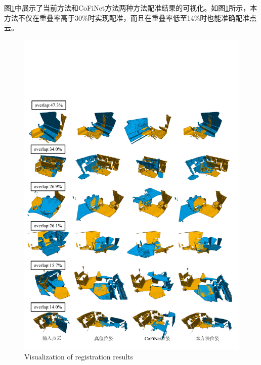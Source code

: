     图\ref{fig:4-4}中展示了当前方法和CoFiNet方法两种方法配准结果的可视化。如图\ref{fig:4-4}所示，本方法不仅在重叠率高于30\%时实现配准，而且在重叠率低至14\%时也能准确配准点云。
    \vspace{-0.1cm}
    \begin{figure}[H]
        \centering
        \includegraphics[width = \textwidth]{my/figure/4-4.pdf}
        {\wuhao Visualization of registration results
        }
        \label{fig:4-4}
    \end{figure}
    \vspace{-0.35cm}


